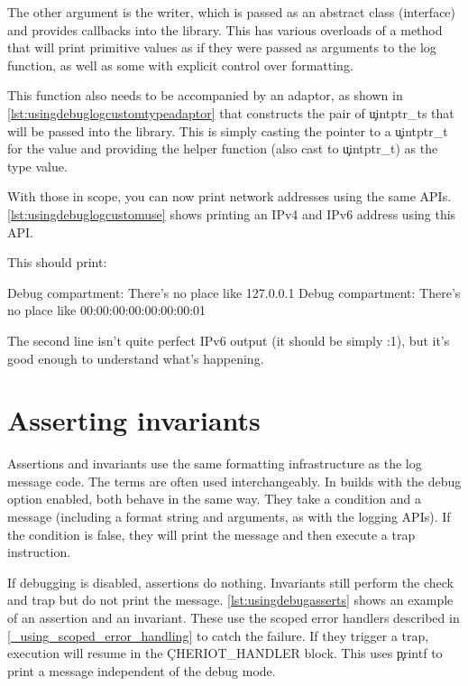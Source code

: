 {The other argument is the writer, which is passed as an abstract class (interface) and provides callbacks into the  library.
This has various overloads of a  method that will print primitive values as if they were passed as arguments to the log function, as well as some with explicit control over formatting.

This function also needs to be accompanied by an adaptor, as shown in \ref{lst:usingdebuglogcustomtypeadaptor} that constructs the pair of \c{uintptr_t}s that will be passed into the library.
This is simply casting the pointer to a \c{uintptr_t} for the value and providing the helper function (also cast to \c{uintptr_t}) as the type value.

\codelisting[filename=examples/debug_helpers/example.cc,marker=type_adaptor,label=lst:usingdebuglogcustomtypeadaptor,caption="Defining an adaptor for a custom type."]{}

With those in scope, you can now print network addresses using the same APIs.
\ref{lst:usingdebuglogcustomuse} shows printing an IPv4 and IPv6 address using this API.

\codelisting[filename=examples/debug_helpers/example.cc,marker=custom_log,label=lst:usingdebuglogcustomuse,caption="Printing a custom type with the debug APIs."]{}

This should print:

\begin{console}
Debug compartment: There's no place like 127.0.0.1
Debug compartment: There's no place like 00:00:00:00:00:00:00:01
\end{console}

The second line isn't quite perfect IPv6 output (it should be simply :1), but it's good enough to understand what's happening.

\section{Asserting invariants}

Assertions and invariants use the same formatting infrastructure as the log message code.
The terms are often used interchangeably.
In builds with the debug option enabled, both behave in the same way.
They take a condition and a message (including a format string and arguments, as with the logging APIs).
If the condition is false, they will print the message and then execute a trap instruction.

If debugging is disabled, assertions do nothing.
Invariants still perform the check and trap but do not print the message.
\ref{lst:usingdebugasserts} shows an example of an assertion and an invariant.
These use the scoped error handlers described in \ref{_using_scoped_error_handling} to catch the failure.
If they trigger a trap, execution will resume in the \c{CHERIOT_HANDLER} block.
This uses \c{printf} to print a message independent of the debug mode.

}
